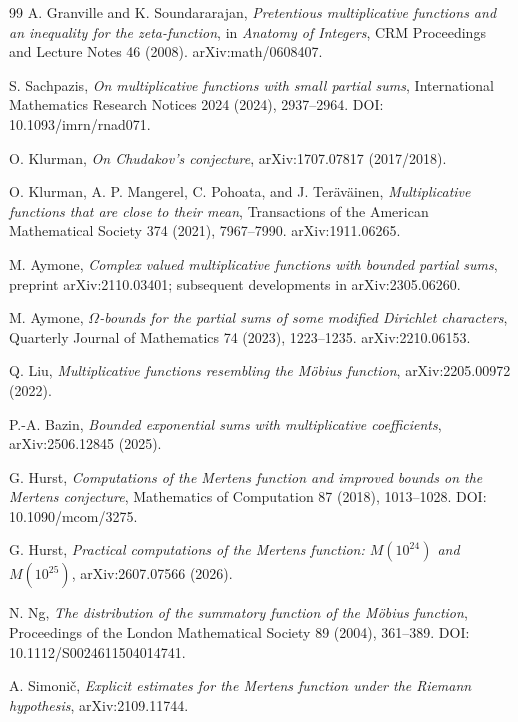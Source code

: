\documentclass[11pt]{article}
\begin{document}
\begin{thebibliography}{99}
A. Granville and K. Soundararajan,
\emph{Pretentious multiplicative functions and an inequality for the zeta-function},
in \emph{Anatomy of Integers}, CRM Proceedings and Lecture Notes 46 (2008).
arXiv:math/0608407.

S. Sachpazis,
\emph{On multiplicative functions with small partial sums},
International Mathematics Research Notices 2024 (2024), 2937--2964.
DOI: 10.1093/imrn/rnad071.


O. Klurman,
\emph{On Chudakov's conjecture},
arXiv:1707.07817 (2017/2018).

O. Klurman, A. P. Mangerel, C. Pohoata, and J. Teräväinen,
\emph{Multiplicative functions that are close to their mean},
Transactions of the American Mathematical Society 374 (2021), 7967--7990.
arXiv:1911.06265.

M. Aymone,
\emph{Complex valued multiplicative functions with bounded partial sums},
preprint arXiv:2110.03401; subsequent developments in arXiv:2305.06260.

M. Aymone,
\emph{$\Omega$-bounds for the partial sums of some modified Dirichlet characters},
Quarterly Journal of Mathematics 74 (2023), 1223--1235.
arXiv:2210.06153.

Q. Liu,
\emph{Multiplicative functions resembling the Möbius function},
arXiv:2205.00972 (2022).

P.-A. Bazin,
\emph{Bounded exponential sums with multiplicative coefficients},
arXiv:2506.12845 (2025).

G. Hurst,
\emph{Computations of the Mertens function and improved bounds on the Mertens conjecture},
Mathematics of Computation 87 (2018), 1013--1028.
DOI: 10.1090/mcom/3275.

G. Hurst,
\emph{Practical computations of the Mertens function: $M(10^{24})$ and $M(10^{25})$},
arXiv:2607.07566 (2026).

N. Ng,
\emph{The distribution of the summatory function of the Möbius function},
Proceedings of the London Mathematical Society 89 (2004), 361--389.
DOI: 10.1112/S0024611504014741.

A. Simonič,
\emph{Explicit estimates for the Mertens function under the Riemann hypothesis},
arXiv:2109.11744.

\end{thebibliography}
\end{document}
